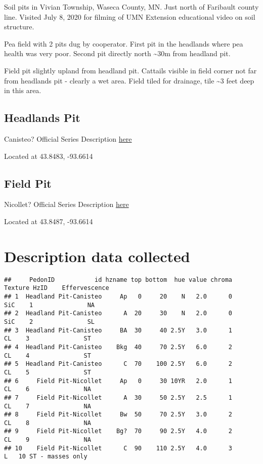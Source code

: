 \documentclass[
]{book}
\begin{document}
Soil pits in Vivian Township, Waseca County, MN. Just north of Faribault county line. Visited July 8, 2020 for filming of UMN Extension educational video on soil structure.

Pea field with 2 pits dug by cooperator. First pit in the headlands where pea health was very poor. Second pit directly north \textasciitilde30m from headland pit.

Field pit slightly upland from headland pit. Cattails visible in field corner not far from headlands pit - clearly a wet area. Field tiled for drainage, tile \textasciitilde3 feet deep in this area.

\hypertarget{headlands-pit}{%
\subsection{Headlands Pit}\label{headlands-pit}}

Canisteo? Official Series Description \href{https://soilseries.sc.egov.usda.gov/OSD_Docs/C/CANISTEO.html}{here}

Located at 43.8483, -93.6614

\hypertarget{field-pit}{%
\subsection{Field Pit}\label{field-pit}}

Nicollet? Official Series Description \href{https://soilseries.sc.egov.usda.gov/OSD_Docs/N/NICOLLET.html}{here}

Located at 43.8487, -93.6614

\hypertarget{description-data-collected}{%
\section{Description data collected}\label{description-data-collected}}

\begin{verbatim}
##     PedonID           id hzname top bottom  hue value chroma Texture HzID    Effervescence
## 1  Headland Pit-Canisteo     Ap   0     20    N   2.0      0     SiC    1               NA
## 2  Headland Pit-Canisteo      A  20     30    N   2.0      0     SiC    2               SL
## 3  Headland Pit-Canisteo     BA  30     40 2.5Y   3.0      1      CL    3               ST
## 4  Headland Pit-Canisteo    Bkg  40     70 2.5Y   6.0      2      CL    4               ST
## 5  Headland Pit-Canisteo      C  70    100 2.5Y   6.0      2      CL    5               ST
## 6     Field Pit-Nicollet     Ap   0     30 10YR   2.0      1      CL    6               NA
## 7     Field Pit-Nicollet      A  30     50 2.5Y   2.5      1      CL    7               NA
## 8     Field Pit-Nicollet     Bw  50     70 2.5Y   3.0      2      CL    8               NA
## 9     Field Pit-Nicollet    Bg?  70     90 2.5Y   4.0      2      CL    9               NA
## 10    Field Pit-Nicollet      C  90    110 2.5Y   4.0      3       L   10 ST - masses only
\end{verbatim}
\end{document}
